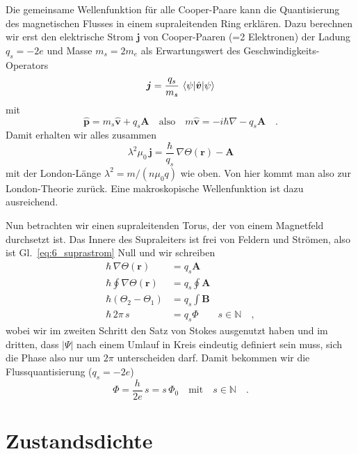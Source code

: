 Die gemeinsame Wellenfunktion für alle Cooper-Paare kann die Quantisierung des magnetischen Flusses in einem supraleitenden Ring erklären. Dazu berechnen wir erst den elektrische Strom $\bm{j}$ von Cooper-Paaren (=2 Elektronen) der Ladung $q_s = -2 e$ und Masse $m_s = 2 m_e$   als Erwartungswert des Geschwindigkeits-Operators
\begin{equation}
    \bm{j} = \frac{q_s}{m_s} \, \braket{\psi | \hat{\bm{v}} | \psi}
\end{equation}
 mit 
 \begin{equation}
   \hat{\bm{p}} = m_s \hat{\bm{v}} +  q_s \bm{A}   \quad \text{also} \quad m \hat{\bm{v}} = -i \hbar \nabla - q_s \bm{A}
   \quad .
 \end{equation}
 Damit erhalten wir alles zusammen
 \begin{equation}
  \lambda^2 \mu_0 \,  \bm{j} =   \frac{ \hbar }{q_s} \, \nabla \Theta (\bm{r}) - \bm{A} \label{eq:6_suprastrom}
 \end{equation}
 mit der London-Länge $\lambda^2 = m/ (n \mu_0 q)$ wie oben.
 Von hier kommt man also zur London-Theorie zurück. Eine makroskopische Wellenfunktion ist dazu ausreichend.

Nun betrachten wir einen supraleitenden Torus, der von einem Magnetfeld durchsetzt ist.  Das Innere des Supraleiters ist frei von Feldern und Strömen, also ist Gl.~\ref{eq:6_suprastrom} Null und wir schreiben
\begin{align}
     \hbar  \, \nabla \Theta (\bm{r})  &=  q_s \bm{A} \\
     \hbar \oint \nabla \Theta (\bm{r})& =  q_s \oint \bm{A}  \\
     \hbar (\Theta_2 - \Theta_1) & = q_s \int \bm{B} \\
   \hbar \, 2 \pi \, s & = q_s \Phi \qquad s \in \mathbb{N}  \quad ,
\end{align}
wobei wir im zweiten Schritt den Satz von Stokes ausgenutzt haben und im dritten, dass $|\Psi|$ nach einem Umlauf in Kreis eindeutig definiert sein muss, sich die Phase also nur um $2\pi$ unterscheiden darf. Damit bekommen wir die Flussquantisierung ($q_s = -2e$)
\begin{equation}
    \Phi = \frac{h}{2 e} \, s = s \, \Phi_0 \quad \text{mit} \quad s \in \mathbb{N} \quad .
\end{equation}


\section*{Zustandsdichte}


